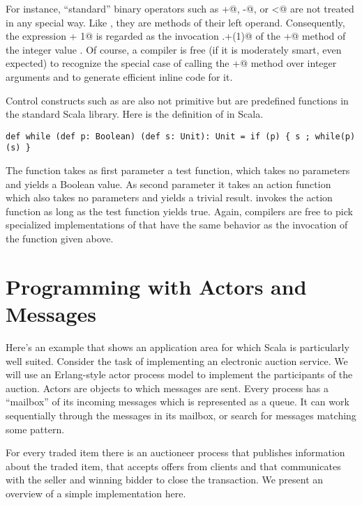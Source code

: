 \documentclass[11pt]{report}
\begin{document}
For instance, ``standard'' binary operators such as \verb@+@,
\verb@-@, or \verb@<@ are not treated in any special way. Like
\verb@append@, they are methods of their left operand. Consequently,
the expression \verb@i + 1@ is regarded as the invocation
\verb@i.+(1)@ of the \verb@+@ method of the integer value \verb@x@.
Of course, a compiler is free (if it is moderately smart, even expected)
to recognize the special case of calling the \verb@+@ method over
integer arguments and to generate efficient inline code for it.

Control constructs such as \verb@while@ are also not primitive but are
predefined functions in the standard Scala library. Here is the
definition of \verb@while@ in Scala.
\begin{verbatim}
def while (def p: Boolean) (def s: Unit): Unit = if (p) { s ; while(p)(s) }
\end{verbatim}
The \verb@while@ function takes as first parameter a test function,
which takes no parameters and yields a Boolean value. As second
parameter it takes an action function which also takes no parameters
and yields a trivial result. \verb@while@ invokes the action function
as long as the test function yields true. Again, compilers are free to
pick specialized implementations of \verb@while@ that have the same
behavior as the invocation of the function given above.

\chapter{\label{sec:ex-auction}Programming with Actors and Messages}

Here's an example that shows an application area for which Scala is
particularly well suited. Consider the task of implementing an
electronic auction service. We will use an Erlang-style actor process
model to implement the participants of the auction. Actors are
objects to which messages are sent. Every process has a ``mailbox'' of
its incoming messages which is represented as a queue. It can work
sequentially through the messages in its mailbox, or search for
messages matching some pattern.

For every traded item there is an auctioneer process that publishes
information about the traded item, that accepts offers from clients
and that communicates with the seller and winning bidder to close the
transaction. We present an overview of a simple implementation
here.
\end{document}
